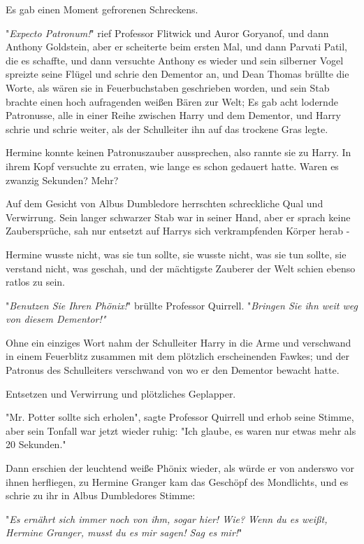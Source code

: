 {Es gab einen Moment gefrorenen Schreckens.

"\emph{Expecto Patronum!}" rief Professor Flitwick und Auror Goryanof, und dann Anthony Goldstein, aber er scheiterte beim ersten Mal, und dann Parvati Patil, die es schaffte, und dann versuchte Anthony es wieder und sein silberner Vogel spreizte seine Flügel und schrie den Dementor an, und Dean Thomas brüllte die Worte, als wären sie in Feuerbuchstaben geschrieben worden, und sein Stab brachte einen hoch aufragenden weißen Bären zur Welt; Es gab acht lodernde Patronusse, alle in einer Reihe zwischen Harry und dem Dementor, und Harry schrie und schrie weiter, als der Schulleiter ihn auf das trockene Gras legte.

Hermine konnte keinen Patronuszauber aussprechen, also rannte sie zu Harry. In ihrem Kopf versuchte zu erraten, wie lange es schon gedauert hatte. Waren es zwanzig Sekunden? Mehr?

Auf dem Gesicht von Albus Dumbledore herrschten schreckliche Qual und Verwirrung. Sein langer schwarzer Stab war in seiner Hand, aber er sprach keine Zaubersprüche, sah nur entsetzt auf Harrys sich verkrampfenden Körper herab -

Hermine wusste nicht, was sie tun sollte, sie wusste nicht, was sie tun sollte, sie verstand nicht, was geschah, und der mächtigste Zauberer der Welt schien ebenso ratlos zu sein.

"\emph{Benutzen Sie Ihren Phönix!}" brüllte Professor Quirrell. "\emph{Bringen Sie ihn weit weg von diesem Dementor!"}

Ohne ein einziges Wort nahm der Schulleiter Harry in die Arme und verschwand in einem Feuerblitz zusammen mit dem plötzlich erscheinenden Fawkes; und der Patronus des Schulleiters verschwand von wo er den Dementor bewacht hatte.

Entsetzen und Verwirrung und plötzliches Geplapper.

"Mr. Potter sollte sich erholen", sagte Professor Quirrell und erhob seine Stimme, aber sein Tonfall war jetzt wieder ruhig: "Ich glaube, es waren nur etwas mehr als 20 Sekunden."

Dann erschien der leuchtend weiße Phönix wieder, als würde er von anderswo vor ihnen herfliegen, zu Hermine Granger kam das Geschöpf des Mondlichts, und es schrie zu ihr in Albus Dumbledores Stimme:

"\emph{Es ernährt sich immer noch von ihm, sogar hier! Wie? Wenn du es weißt, Hermine Granger, musst du es mir sagen! Sag es mir!}"

}
